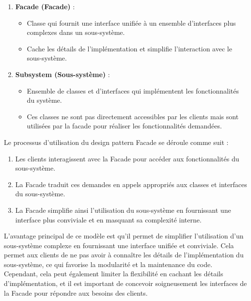 \begin{enumerate}[leftmargin=*,labelsep=3mm]
    \item \textbf{Facade (Facade)} :
    \begin{itemize}
        \item Classe qui fournit une interface unifiée à un ensemble d'interfaces plus complexes dans un sous-système.
        \item Cache les détails de l'implémentation et simplifie l'interaction avec le sous-système.
    \end{itemize}
    
    \item \textbf{Subsystem (Sous-système)} :
    \begin{itemize}
        \item Ensemble de classes et d'interfaces qui implémentent les fonctionnalités du système.
        \item Ces classes ne sont pas directement accessibles par les clients mais sont utilisées par la facade pour réaliser les fonctionnalités demandées.
    \end{itemize}
\end{enumerate}

Le processus d'utilisation du design pattern Facade se déroule comme suit :

\begin{enumerate}[leftmargin=*,labelsep=3mm]
    \item Les clients interagissent avec la Facade pour accéder aux fonctionnalités du sous-système.
    \item La Facade traduit ces demandes en appels appropriés aux classes et interfaces du sous-système.
    \item La Facade simplifie ainsi l'utilisation du sous-système en fournissant une interface plus conviviale et en masquant sa complexité interne.
\end{enumerate}

L'avantage principal de ce modèle est qu'il permet de simplifier l'utilisation d'un sous-système complexe en fournissant une interface unifiée et conviviale. Cela permet aux clients de ne pas avoir à connaître les détails de l'implémentation du sous-système, ce qui favorise la modularité et la maintenance du code. Cependant, cela peut également limiter la flexibilité en cachant les détails d'implémentation, et il est important de concevoir soigneusement les interfaces de la Facade pour répondre aux besoins des clients.


